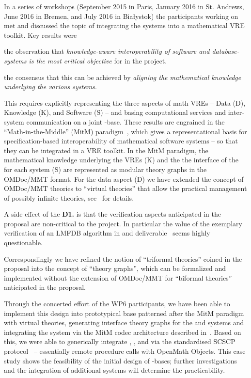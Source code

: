 \documentclass{deliverablereport}
\begin{document}
In a series of workshops (September 2015 in Paris, January 2016 in St. Andrews, June 2016
in Bremen, and July 2016 in Bia{\l}ystok) the participants working on  met
and discussed the topic of integrating the \pn systems into a mathematical VRE toolkit.
Key results were
\begin{compactitem}[\bf D1.]
\item the observation that \emph{knowledge-aware interoperability of software and
    database-systems is the most critical objective} for  in the \pn
  project.
\item the consensus that this can be achieved by \emph{aligning the mathematical knowledge
    underlying the various systems}.
\end{compactitem}
This requires explicitly representing the three aspects of math VREs -- Data (D),
Knowledge (K), and Software (S) -- and basing computational services and inter-system
communication on a joint \DKS-base. These results are engrained in the
``Math-in-the-Middle'' (MitM) paradigm~\cite{DehKohKon:iop16}, which gives a
representational basis for specification-based interoperability of mathematical software
systems -- so that they can be integrated in a VRE toolkit. In the MitM paradigm, the
mathematical knowledge underlying the VREs (K) and the the interface of the for each
system (S) are represented as modular theory graphs in the OMDoc/MMT format. For the data
aspect (D) we have extended the concept of OMDoc/MMT theories to ``virtual theories'' that
allow the practical management of possibly infinite theories, see~\cite{ODK-D6.2} for
details.

A side effect of the \textbf{D1.} is that the verification aspects anticipated in the
proposal are non-critical to the \pn project. In particular the value of the exemplary
verification of an LMFDB algorithm in  and
deliverable~ seems highly questionable.

Correspondingly we have refined the notion of ``triformal theories'' coined in the
proposal into the concept of ``\DKS theory graphs'', which can be formalized and
implemented without the extension of OMDoc/MMT for ``biformal theories'' anticipated in
the proposal.

Through the concerted effort of the WP6 participants, we have been able to implement
this design into prototypical \DKS base patterned after the MitM paradigm with virtual
theories, generating interface theory graphs for the \GAP and \Sage systems and
integrating the \LMFDB system via the MitM codec architecture described
in~\cite{ODK-D6.2}. Based on this, we were able to generically integrate \GAP, \Sage, and
\LMFDB via the standardised SCSCP protocol~\cite{HorRoz:ossp09} -- essentially remote
procedure calls with OpenMath Objects. This case study shows the feasibility of the
initial design of \DKS-bases; further investigations and the integration of additional
systems will determine the practicability.
\end{document}
